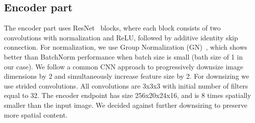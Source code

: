 \documentclass[runningheads]{llncs}
\begin{document}
\subsection{Encoder part}
The encoder part uses  ResNet~\cite{He16}  blocks, where each block consists of two convolutions with normalization and ReLU, followed by additive identity skip connection. For normalization, we use Group Normalization (GN)~\cite{Wu18}, which shows better than BatchNorm performance when batch size is small (bath size of 1 in our case).  We follow a common CNN approach to progressively downsize image dimensions by 2 and simultaneously increase feature size by 2.  For downsizing we use strided convolutions.   All convolutions are 3x3x3 with initial number of filters equal to 32.  
The encoder endpoint has size 256x20x24x16, and is 8 times spatially smaller than the input image. We decided against further downsizing to preserve more spatial content. 

\end{document}

